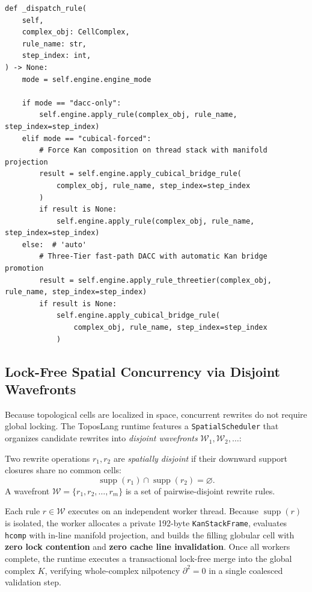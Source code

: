 \documentclass[acmsmall,screen,nonacm]{acmart}
\newcommand{\supp}{\operatorname{supp}}
\newcommand{\hcomp}{\texttt{hcomp}}
\newcommand{\KSF}{\texttt{KanStackFrame}}
\begin{document}
\begin{lstlisting}[style=pycode,caption={Dynamic rule dispatch routing in ToposLang's \texttt{ToposInterpreter}.},label=lst:interpreter-dispatch]
def _dispatch_rule(
    self,
    complex_obj: CellComplex,
    rule_name: str,
    step_index: int,
) -> None:
    mode = self.engine.engine_mode

    if mode == "dacc-only":
        self.engine.apply_rule(complex_obj, rule_name, step_index=step_index)
    elif mode == "cubical-forced":
        # Force Kan composition on thread stack with manifold projection
        result = self.engine.apply_cubical_bridge_rule(
            complex_obj, rule_name, step_index=step_index
        )
        if result is None:
            self.engine.apply_rule(complex_obj, rule_name, step_index=step_index)
    else:  # 'auto'
        # Three-Tier fast-path DACC with automatic Kan bridge promotion
        result = self.engine.apply_rule_threetier(complex_obj, rule_name, step_index=step_index)
        if result is None:
            self.engine.apply_cubical_bridge_rule(
                complex_obj, rule_name, step_index=step_index
            )
\end{lstlisting}

\subsection{Lock-Free Spatial Concurrency via Disjoint Wavefronts}
\label{sec:spatial-concurrency}

Because topological cells are localized in space, concurrent rewrites do not require global locking. The ToposLang runtime features a \texttt{SpatialScheduler} that organizes candidate rewrites into \emph{disjoint wavefronts} $\mathcal{W}_1, \mathcal{W}_2, \dots$:

\begin{definition}
Two rewrite operations $r_1, r_2$ are \emph{spatially disjoint} if their downward support closures share no common cells:
\[
  \supp(r_1) \cap \supp(r_2) = \varnothing.
\]
A wavefront $\mathcal{W} = \{r_1, r_2, \dots, r_m\}$ is a set of pairwise-disjoint rewrite rules.
\end{definition}

Each rule $r \in \mathcal{W}$ executes on an independent worker thread. Because $\supp(r)$ is isolated, the worker allocates a private 192-byte \KSF{}, evaluates \hcomp{} with in-line manifold projection, and builds the filling globular cell with \textbf{zero lock contention} and \textbf{zero cache line invalidation}. Once all workers complete, the runtime executes a transactional lock-free merge into the global complex $K$, verifying whole-complex nilpotency $\partial^2 = 0$ in a single coalesced validation step.
\end{document}
